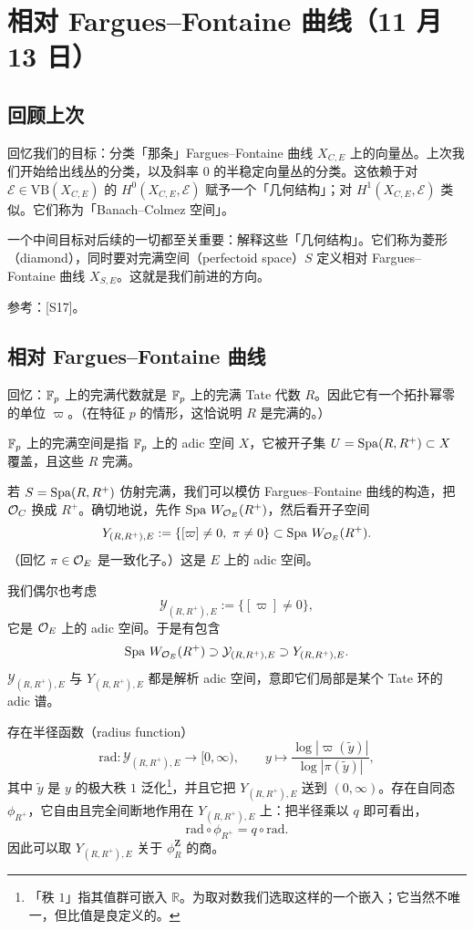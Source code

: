 \section[相对 Fargues--Fontaine 曲线]{相对 Fargues--Fontaine 曲线（11 月 13 日）}


\subsection{回顾上次}

回忆我们的目标：分类「那条」Fargues--Fontaine 曲线 $X_{C,E}$ 上的向量丛。上次我们开始给出线丛的分类，以及斜率 $0$ 的半稳定向量丛的分类。这依赖于对 $\mathcal E\in\mathrm{VB}(X_{C,E})$ 的 $H^0(X_{C,E},\mathcal E)$ 赋予一个「几何结构」；对 $H^1(X_{C,E},\mathcal E)$ 类似。它们称为「Banach--Colmez 空间」。

一个中间目标对后续的一切都至关重要：解释这些「几何结构」。它们称为菱形（diamond），同时要对完满空间（perfectoid space）$S$ 定义相对 Fargues--Fontaine 曲线 $X_{S,E}$。这就是我们前进的方向。

参考：[S17]。

\subsection{相对 Fargues--Fontaine 曲线}

回忆：$\mathbb{F}_p$ 上的完满代数就是 $\mathbb{F}_p$ 上的完满 Tate 代数 $R$。因此它有一个拓扑幂零的单位 $\varpi$。（在特征 $p$ 的情形，这恰说明 $R$ 是完满的。）

$\mathbb{F}_p$ 上的完满空间是指 $\mathbb{F}_p$ 上的 adic 空间 $X$，它被开子集 $U=\operatorname{Spa}(R,R^+)\subset X$ 覆盖，且这些 $R$ 完满。

若 $S=\operatorname{Spa}(R,R^+)$ 仿射完满，我们可以模仿 Fargues--Fontaine 曲线的构造，把 $\mathcal{O}_C$ 换成 $R^+$。确切地说，先作 $\operatorname{Spa}\,W_{\mathcal{O}_E}(R^+)$，然后看开子空间
\[
Y_{(R,R^+),E}:=\{[\varpi]\neq 0,\ \pi\neq 0\}\subset\operatorname{Spa}\,W_{\mathcal{O}_E}(R^+).
\]
（回忆 $\pi\in\mathcal{O}_E$ 是一致化子。）这是 $E$ 上的 adic 空间。

我们偶尔也考虑
\[
\mathcal Y_{(R,R^+),E}:=\{[\varpi]\neq 0\},
\]
它是 $\mathcal{O}_E$ 上的 adic 空间。于是有包含
\[
\operatorname{Spa}\,W_{\mathcal{O}_E}(R^+)\supset\mathcal Y_{(R,R^+),E}\supset Y_{(R,R^+),E}.
\]
$\mathcal Y_{(R,R^+),E}$ 与 $Y_{(R,R^+),E}$ 都是解析 adic 空间，意即它们局部是某个 Tate 环的 adic 谱。

存在半径函数（radius function）
\[
\mathrm{rad}\colon\mathcal Y_{(R,R^+),E}\to[0,\infty),\qquad
y\mapsto\frac{\log|\varpi(\tilde y)|}{\log|\pi(\tilde y)|},
\]
其中 $\tilde y$ 是 $y$ 的极大秩 $1$ 泛化\footnote{「秩 $1$」指其值群可嵌入 $\mathbb R$。为取对数我们选取这样的一个嵌入；它当然不唯一，但比值是良定义的。}，并且它把 $Y_{(R,R^+),E}$ 送到 $(0,\infty)$。存在自同态 $\phi_{R^+}$，它自由且完全间断地作用在 $Y_{(R,R^+),E}$ 上：把半径乘以 $q$ 即可看出，
\[
\mathrm{rad}\circ\phi_{R^+}=q\circ\mathrm{rad}.
\]
因此可以取 $Y_{(R,R^+),E}$ 关于 $\phi_R^{\mathbf Z}$ 的商。


